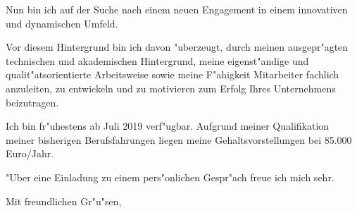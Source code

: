 \documentclass[10pt,a4paper]{dinbrief}
\begin{document}
\begin{letter}
Nun bin ich auf der Suche nach einem neuen Engagement in einem innovativen und dynamischen Umfeld.

Vor diesem Hintergrund bin ich davon "uberzeugt, durch meinen ausgepr"agten technischen und akademischen Hintergrund, meine eigenst"andige und qualit"atsorientierte Arbeitsweise sowie meine F"ahigkeit Mitarbeiter fachlich anzuleiten, zu entwickeln und zu motivieren zum Erfolg Ihres Unternehmens beizutragen.

Ich bin fr"uhestens ab Juli 2019 verf"ugbar. Aufgrund meiner Qualifikation meiner bisherigen Berufsfahrungen liegen meine Gehaltsvorstellungen bei 85.000 Euro/Jahr. 

"Uber eine Einladung zu einem pers"onlichen Gespr"ach freue ich mich sehr.

\closing{Mit freundlichen Gr"u"sen,}
\end{letter}
\end{document}
